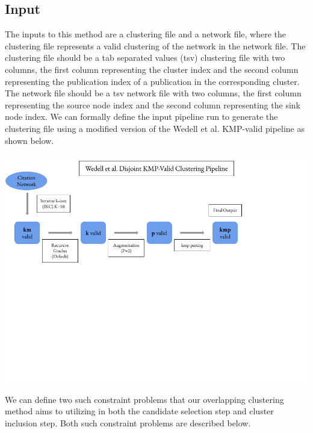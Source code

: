 \documentclass{article}
\begin{document}
\subsection{Input}
The inputs to this method are a clustering file and a network file, where the clustering file represents a valid clustering of the network in the network file. The clustering file should be a tab separated values (tsv) clustering file with two columns, the first column representing the cluster index and the second column representing the publication index of a publication in the corresponding cluster. The network file should be a tsv network file with two columns, the first column representing the source node index and the second column representing the sink node index.
\newline\newline
We can formally define the input pipeline run to generate the clustering file using a modified version of the Wedell et al. KMP-valid pipeline as shown below.
\newline\newline
\begin{center}
    \includegraphics[trim={0 12cm 0 0},clip, scale=0.5]{Overlapping Pipeline Drawing.png}
\end{center}
\newline\newline
We can define two such constraint problems that our overlapping clustering method aims to utilizing in both the candidate selection step and cluster inclusion step. Both such constraint problems are described below. 
\end{document}
